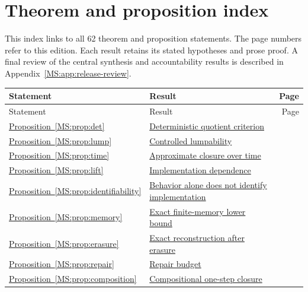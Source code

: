 \documentclass[11pt,oneside,openany]{book}
\numberwithin{equation}{section}
\begin{document}

\section{Theorem and proposition index}\label{MS:app:statement-index}
This index links to all 62 theorem and proposition statements. The page numbers refer to this edition. Each result retains its stated hypotheses and prose proof. A final review of the central synthesis and accountability results is described in Appendix~\ref{MS:app:release-review}.
\begingroup\small\setlength{\tabcolsep}{4pt}\renewcommand{\arraystretch}{1.15}
\begin{longtable}{@{}P{.19\linewidth}P{.69\linewidth}r@{}}
\toprule Statement & Result & Page\\\midrule\endfirsthead
\toprule Statement & Result & Page\\\midrule\endhead
\bottomrule\endfoot
\hyperref[MS:prop:det]{Proposition~\ref*{MS:prop:det}} & \hyperref[MS:prop:det]{Deterministic quotient criterion} & \pageref{MS:prop:det}\\
\hyperref[MS:prop:lump]{Proposition~\ref*{MS:prop:lump}} & \hyperref[MS:prop:lump]{Controlled lumpability} & \pageref{MS:prop:lump}\\
\hyperref[MS:prop:time]{Proposition~\ref*{MS:prop:time}} & \hyperref[MS:prop:time]{Approximate closure over time} & \pageref{MS:prop:time}\\
\hyperref[MS:prop:lift]{Proposition~\ref*{MS:prop:lift}} & \hyperref[MS:prop:lift]{Implementation dependence} & \pageref{MS:prop:lift}\\
\hyperref[MS:prop:identifiability]{Proposition~\ref*{MS:prop:identifiability}} & \hyperref[MS:prop:identifiability]{Behavior alone does not identify implementation} & \pageref{MS:prop:identifiability}\\
\hyperref[MS:prop:memory]{Proposition~\ref*{MS:prop:memory}} & \hyperref[MS:prop:memory]{Exact finite-memory lower bound} & \pageref{MS:prop:memory}\\
\hyperref[MS:prop:erasure]{Proposition~\ref*{MS:prop:erasure}} & \hyperref[MS:prop:erasure]{Exact reconstruction after erasure} & \pageref{MS:prop:erasure}\\
\hyperref[MS:prop:repair]{Proposition~\ref*{MS:prop:repair}} & \hyperref[MS:prop:repair]{Repair budget} & \pageref{MS:prop:repair}\\
\hyperref[MS:prop:composition]{Proposition~\ref*{MS:prop:composition}} & \hyperref[MS:prop:composition]{Compositional one-step closure} & \pageref{MS:prop:composition}\\

\end{longtable}
\end{document}
